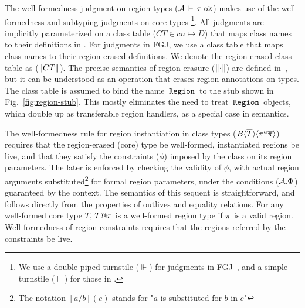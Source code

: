 \noindent The well-formedness judgment on region types
(${\mathcal{A}}\,\vdash\,\tau \; \texttt{ok}$) makes use of the well-formedness and subtyping
judgments on core types \footnote{We use a double-piped turnstile
($\Vdash$) for judgments in FGJ~\cite{fgj}, and a simple turnstile
($\vdash$) for those in \FB.}. All judgments are implicitly
parameterized on a class table ($CT \in cn \mapsto D$) that maps class
names to their definitions in \FB. For judgments in FGJ, we use a
class table that maps class names to their region-erased definitions.
We denote the region-erased class table as ($\left\| CT \right\|$). The precise
semantics of region erasure ($\left\| \cdot \right\|$) are defined
in~\cite{techrep}, but it can be understood as an operation that
erases region annotations on types. The class table is assumed to bind
the name $\,{\tt Region}\,$ to the stub shown in Fig.~\ref{fig:region-stub}.
This mostly eliminates the need to treat $\,{\tt Region}\,$ objects, which double
up as transferable region handlers, as a special case in semantics.

The well-formedness rule for region instantiation in class types
($B\langle \overline{T} \rangle\langle \pi^a\overline{\pi} \rangle$) requires that the region-erased
(core) type be well-formed, instantiated regions be live, and that
they satisfy the constraints ($\phi$) imposed by the class on its
region parameters. The later is enforced by checking the validity of
$\phi$, with actual region arguments substituted\footnote{The notation
$[a/b](e)$ stands for "$a$ is substituted for $b$ in $e$"} for formal
region parameters, under the conditions (${\mathcal{A}}.\Phi$) guaranteed by
the context. The semantics of this sequent is straightforward, and
follows directly from the properties of outlives and equality
relations. For any well-formed core type $T$, $T@\pi$ is a
well-formed region type if $\pi$ is a valid region. Well-formedness
of region constraints requires that the regions referred by the
constraints be live.

